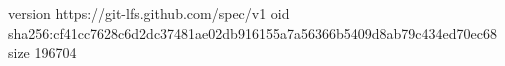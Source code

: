 version https://git-lfs.github.com/spec/v1
oid sha256:cf41cc7628c6d2dc37481ae02db916155a7a56366b5409d8ab79c434ed70ec68
size 196704
